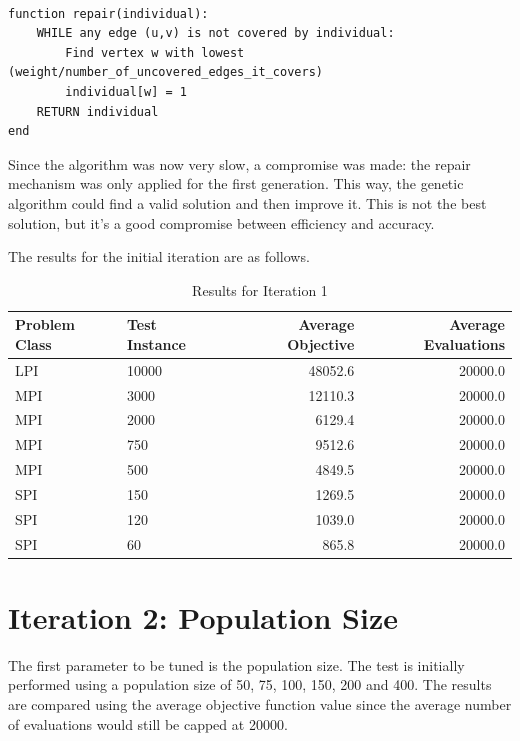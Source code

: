 \begin{lstlisting}[caption=Repair mechanism]

function repair(individual):
    WHILE any edge (u,v) is not covered by individual:
        Find vertex w with lowest (weight/number_of_uncovered_edges_it_covers)
        individual[w] = 1
    RETURN individual
end
\end{lstlisting}

Since the algorithm was now very slow, a compromise was made: the repair mechanism was only applied for the first generation. This way, the genetic algorithm could find a valid solution and then improve it. This is not the best solution, but it's a good compromise between efficiency and accuracy.

The results for the initial iteration are as follows.

\begin{table}[h]
    \centering
    \begin{tabular}{|l l r r|}
        \hline
        \textbf{Problem Class} & \textbf{Test Instance} & \textbf{Average Objective} & \textbf{Average Evaluations} \\
        \hline
        LPI & 10000 & 48052.6 & 20000.0 \\
        MPI & 3000  & 12110.3  & 20000.0 \\
        MPI & 2000  & 6129.4   & 20000.0 \\
        MPI & 750   & 9512.6  & 20000.0 \\
        MPI & 500   & 4849.5   & 20000.0 \\
        SPI & 150   & 1269.5   & 20000.0 \\
        SPI & 120   & 1039.0    & 20000.0 \\
        SPI & 60    & 865.8   & 20000.0 \\
        \hline
    \end{tabular}
    \caption{Results for Iteration 1}
    \label{tab:gen_objective_summary}
\end{table}

\section{Iteration 2: Population Size}

The first parameter to be tuned is the population size. The test is initially performed using a population size of 50, 75, 100, 150, 200 and 400.
The results are compared using the average objective function value since the average number of evaluations would still be capped at 20000.

